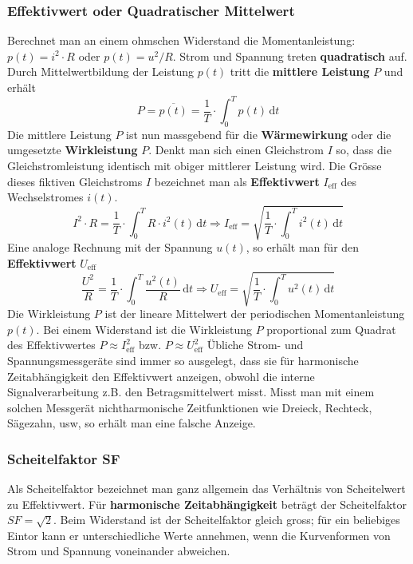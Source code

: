 \subsubsection{Effektivwert oder Quadratischer Mittelwert}
Berechnet man an einem ohmschen Widerstand die Momentanleistung: $p\left(t\right)=i^2\cdot R$ oder $p\left(t\right)=u^2/R$. Strom und Spannung treten \textbf{quadratisch} auf. Durch Mittelwertbildung der Leistung $p\left(t\right)$ tritt die \textbf{mittlere Leistung} $P$ und erhält
\begin{equation}
\boxed{P=\overline{p\left(t\right)}=\dfrac{1}{T}\cdot \displaystyle \int_0^Tp\left(t\right)\,\text{d}t}
\end{equation}
Die mittlere Leistung $P$ ist nun massgebend für die \textbf{Wärmewirkung} oder die umgesetzte \textbf{Wirkleistung} $P$. Denkt man sich einen Gleichstrom $I$ so, dass die Gleichstromleistung identisch mit obiger mittlerer Leistung wird. Die Grösse dieses fiktiven Gleichstroms $I$ bezeichnet man als \textbf{Effektivwert} $I_{\text{eff}}$ des Wechselstromes $i\left(t\right)$.
\begin{equation}
\boxed{
I^2\cdot R=\dfrac{1}{T}\cdot \displaystyle \int_0^TR\cdot i^2\left(t\right)\,\text{d}t\Longrightarrow I_{\text{eff}}=\sqrt{\dfrac{1}{T}\cdot \displaystyle \int_0^Ti^2\left(t\right)\,\text{d}t}
}
\end{equation}
Eine analoge Rechnung mit der Spannung $u\left(t\right)$, so erhält man für den \textbf{Effektivwert} $U_{\text{eff}}$
\begin{equation}
\boxed{\dfrac{U^2}{R}=\dfrac{1}{T}\cdot \displaystyle \int_0^T\dfrac{u^2\left(t\right)}{R}\,\text{d}t\Longrightarrow U_{\text{eff}}=\sqrt{\dfrac{1}{T}\cdot \displaystyle \int_0^Tu^2\left(t\right)\,\text{d}t}}
\end{equation}
Die Wirkleistung $P$ ist der lineare Mittelwert der periodischen Momentanleistung $p\left(t\right)$. Bei einem Widerstand ist die Wirkleistung $P$ proportional zum Quadrat des Effektivwertes $P\approx I_{\text{eff}}^2$ bzw. $P\approx U_{\text{eff}}^2$
\newline\newline
Übliche Strom- und Spannungsmessgeräte sind immer so ausgelegt, dass sie für harmonische Zeitabhängigkeit den Effektivwert anzeigen, obwohl die interne Signalverarbeitung z.B. den Betragsmittelwert misst. Misst man mit einem solchen Messgerät nichtharmonische Zeitfunktionen wie Dreieck, Rechteck, Sägezahn, usw, so erhält man eine falsche Anzeige.
\subsubsection{Scheitelfaktor SF}
Als Scheitelfaktor bezeichnet man ganz allgemein das Verhältnis von Scheitelwert zu Effektivwert. Für \textbf{harmonische Zeitabhängigkeit} beträgt der Scheitelfaktor $SF=\sqrt{2}$. Beim Widerstand ist der Scheitelfaktor gleich gross; für ein beliebiges Eintor kann er unterschiedliche Werte annehmen, wenn die Kurvenformen von Strom und Spannung voneinander abweichen.
